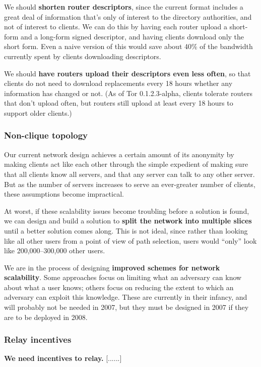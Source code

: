\documentclass{article}
\newcommand{\tmp}[1]{{\bf #1} [......] \\}
\begin{document}
We should {\bf shorten router descriptors}, since the current format includes
a great deal of information that's only of interest to the directory
authorities, and not of interest to clients.  We can do this by having each
router upload a short-form and a long-form signed descriptor, and having
clients download only the short form.  Even a naive version of this would
save about 40\% of the bandwidth currently spent by clients downloading
descriptors.

We should {\bf have routers upload their descriptors even less often}, so
that clients do not need to download replacements every 18 hours whether any
information has changed or not.  (As of Tor 0.1.2.3-alpha, clients tolerate
routers that don't upload often, but routers still upload at least every 18
hours to support older clients.)

\subsubsection{Non-clique topology}
Our current network design achieves a certain amount of its anonymity by
making clients act like each other through the simple expedient of making
sure that all clients know all servers, and that any server can talk to any
other server.  But as the number of servers increases to serve an
ever-greater number of clients, these assumptions become impractical.

At worst, if these scalability issues become troubling before a solution is
found, we can design and build a solution to {\bf split the network into
multiple slices} until a better solution comes along.  This is not ideal,
since rather than looking like all other users from a point of view of path
selection, users would ``only'' look like 200,000--300,000 other users.

We are in the process of designing {\bf improved schemes for network
  scalability}.  Some approaches focus on limiting what an adversary can know
about what a user knows; others focus on reducing the extent to which an
adversary can exploit this knowledge.  These are currently in their infancy,
and will probably not be needed in 2007, but they must be designed in 2007 if
they are to be deployed in 2008.

\subsubsection{Relay incentives}

\tmp{We need incentives to relay.}
\end{document}
